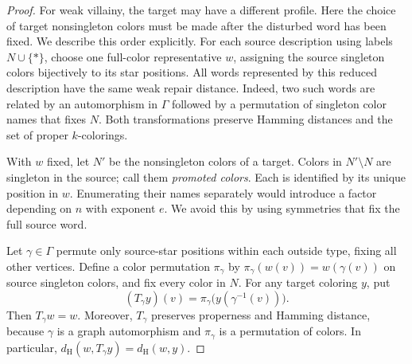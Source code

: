 \documentclass[10pt,a4paper]{amsart}
\numberwithin{equation}{section}
\theoremstyle{definition}
\theoremstyle{remark}
\newcommand{\dH}{d_{\mathrm H}}
\begin{document}
\begin{proof}
For weak villainy, the target may have a different profile. Here
the choice of target nonsingleton colors must be made after the
disturbed word has been fixed. We describe this order explicitly.
For each source description using labels $N\cup\{*\}$, choose
one full-color representative $w$, assigning the source singleton
colors bijectively to its star positions. All words represented
by this reduced description have the same weak repair distance.
Indeed, two such words are related by an automorphism in $\Gamma$
followed by a permutation of singleton color names that fixes
$N$. Both transformations preserve Hamming distances and the set
of proper $k$-colorings.

With $w$ fixed, let $N'$ be the nonsingleton colors of a target.
Colors in $N'\setminus N$ are singleton in the source; call them
\emph{promoted colors}. Each is identified by its unique position
in $w$. Enumerating their names separately would introduce a factor
depending on $n$ with exponent $e$. We avoid this by using symmetries
that fix the full source word.

Let $\gamma\in\Gamma$ permute only source-star positions within
each outside type, fixing all other vertices. Define a color
permutation $\pi_\gamma$ by
$\pi_\gamma(w(v))=w(\gamma(v))$ on source singleton colors, and
fix every color in $N$. For any target coloring $y$, put
\[
(T_\gamma y)(v)=\pi_\gamma\bigl(y(\gamma^{-1}(v))\bigr).
\]
Then $T_\gamma w=w$. Moreover, $T_\gamma$ preserves properness
and Hamming distance, because $\gamma$ is a graph automorphism
and $\pi_\gamma$ is a permutation of colors. In particular,
$\dH(w,T_\gamma y)=\dH(w,y)$.


\end{proof}
\end{document}
